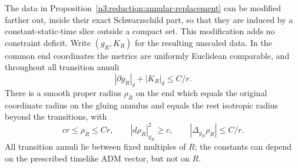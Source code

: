 \begin{lemma}
\label{n3:reduction:vacuum-bend}
The data in Proposition~\ref{n3:reduction:annular-replacement} can be
modified farther out, inside their exact Schwarzschild part, so that
they are induced by a constant-static-time slice outside a compact set.
This modification adds no constraint deficit.  Write $(g_R,K_R)$ for
the resulting unscaled data.  In the common end
coordinates the metrics are uniformly Euclidean comparable,
and throughout all transition annuli
\begin{equation}
 \label{n3:reduction:bend-geometry}
 |\partial g_R|_\delta+|K_R|_\delta\le C/r.
\end{equation}
There is a smooth proper radius $\rho_R$ on the end which equals the original
coordinate radius on the gluing annulus and equals the rest isotropic
radius beyond the transitions, with
\begin{equation}
 \label{n3:reduction:radius-geometry}
 c r\le\rho_R\le C r,\qquad
 |d\rho_R|_{g_R}^2\ge c,
 \qquad |\Delta_{g_R}\rho_R|\le C/r.
\end{equation}
All transition annuli lie between fixed multiples of $R$; the constants
can depend on the prescribed timelike ADM vector, but not on $R$.
\end{lemma}

